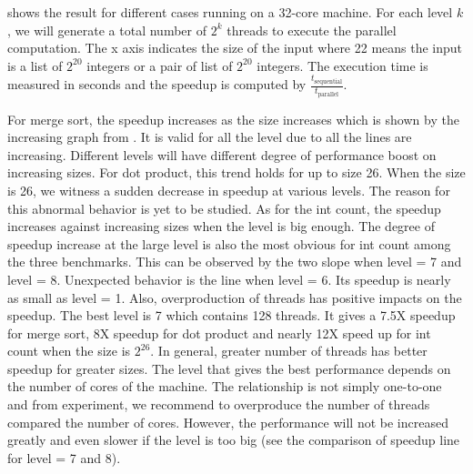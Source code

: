  shows the result for different cases running on a 32-core machine. For each level $k$, we will generate a total number of $2^k$ threads to execute the parallel computation. The x axis indicates the size of the input where 22 means the input is a list of $2^20$ integers or a pair of list of $2^20$ integers. The execution time is measured in seconds and the speedup is computed by $\frac{t_{\text{sequential}}}{t_\text{parallel}}$. 

For merge sort, the speedup increases as the size increases which is shown by the increasing graph from . It is valid for all the level due to all the lines are increasing. Different levels will have different degree of performance boost on increasing sizes. For dot product, this trend holds for up to size 26. When the size is 26, we witness a sudden decrease in speedup at various levels. The reason for this abnormal behavior is yet to be studied. As for the int count, the speedup increases against increasing sizes when the level is big enough. The degree of speedup increase at the large level is also the most obvious for int count among the three benchmarks. This can be observed by the two slope when level = 7 and level = 8. Unexpected behavior is the line when level = 6. Its speedup is nearly as small as level = 1. Also, overproduction of threads has positive impacts on the speedup. The best level is 7 which contains 128 threads. It gives a 7.5X speedup for merge sort, 8X speedup for dot product and nearly 12X speed up for int count when the size is $2^{26}$. In general, greater number of threads has better speedup for greater sizes. The level that gives the best performance depends on the number of cores of the machine. The relationship is not simply one-to-one and from experiment, we recommend to overproduce the number of threads compared the number of cores. However, the performance will not be increased greatly and even slower if the level is too big (see the comparison of speedup line for level = 7 and 8).